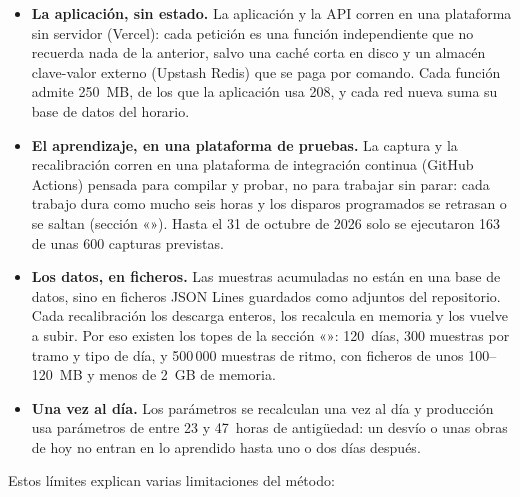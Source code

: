 \begin{itemize}
  \item \textbf{La aplicación, sin estado.} La aplicación y la API corren en una plataforma sin servidor (Vercel): cada
        petición es una función independiente que no recuerda nada de la anterior, salvo una caché corta en disco y un
        almacén clave-valor externo (Upstash Redis) que se paga por comando. Cada función admite 250~MB, de los que la
        aplicación usa 208, y cada red nueva suma su base de datos del horario.
  \item \textbf{El aprendizaje, en una plataforma de pruebas.} La captura y la recalibración corren en una plataforma
        de integración continua (GitHub Actions) pensada para compilar y probar, no para trabajar sin parar: cada trabajo
        dura como mucho seis horas y los disparos programados se retrasan o se saltan (sección «»).
        Hasta el 31 de octubre de 2026 solo se ejecutaron 163 de unas 600 capturas previstas.
  \item \textbf{Los datos, en ficheros.} Las muestras acumuladas no están en una base de datos, sino en ficheros JSON
        Lines guardados como adjuntos del repositorio. Cada recalibración los descarga enteros, los recalcula en memoria
        y los vuelve a subir. Por eso existen los topes de la sección «»: 120~días, 300 muestras
        por tramo y tipo de día, y 500\,000 muestras de ritmo, con ficheros de unos 100--120~MB y menos de 2~GB de memoria.
  \item \textbf{Una vez al día.} Los parámetros se recalculan una vez al día y producción usa parámetros de entre 23 y
        47~horas de antigüedad: un desvío o unas obras de hoy no entran en lo aprendido hasta uno o dos días después.
\end{itemize}

\noindent Estos límites explican varias limitaciones del método:

